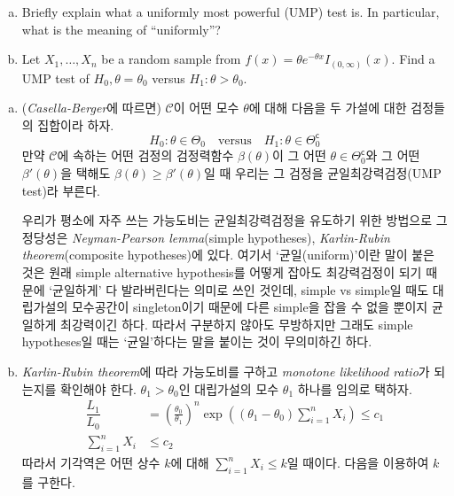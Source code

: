 \documentclass[answers]{exam}
\begin{document}
\begin{questions}
\begin{enumerate}[(a)]
      \item Briefly explain what a uniformly most powerful (UMP) test is. In particular, what is the meaning of ``uniformly''?
      \item Let $X_{1},\ldots,X_{n}$ be a random sample from $f\left(x\right)=\theta e^{-\theta x}I_{\left(0,\infty\right)}\left(x\right)$. Find a UMP test of $H_{0},\theta=\theta_{0}$ versus $H_{1}:\theta>\theta_{0}$.
    \end{enumerate}
    \begin{solution}
      \begin{enumerate}[(a)]
        \item (\emph{Casella-Berger}에 따르면) $\mathcal{C}$이 어떤 모수 $\theta$에 대해 다음을 두 가설에 대한 검정들의 집합이라 하자.
        \begin{equation}
          H_{0}:\theta\in\Theta_{0}\quad \text{versus} \quad H_{1}:\theta\in\Theta_{0}^{\mathsf{c}}
        \end{equation}
        만약 $\mathcal{C}$에 속하는 어떤 검정의 검정력함수 $\beta\left(\theta\right)$이 그 어떤 $\theta\in\Theta_{0}^{\mathsf{c}}$와 그 어떤 $\beta'\left(\theta\right)$을 택해도 $\beta\left(\theta\right)\geq \beta'\left(\theta\right)$일 때 우리는 그 검정을 균일최강력검정(UMP test)라 부른다.\par
        우리가 평소에 자주 쓰는 가능도비는 균일최강력검정을 유도하기 위한 방법으로 그 정당성은 \emph{Neyman-Pearson lemma}(simple hypotheses), \emph{Karlin-Rubin theorem}(composite hypotheses)에 있다. 여기서 `균일(uniform)'이란 말이 붙은 것은 원래 simple alternative hypothesis를 어떻게 잡아도 최강력검정이 되기 때문에 `균일하게' 다 발라버린다는 의미로 쓰인 것인데, simple vs simple일 때도 대립가설의 모수공간이 singleton이기 때문에 다른 simple을 잡을 수 없을 뿐이지 균일하게 최강력이긴 하다. 따라서 구분하지 않아도 무방하지만 그래도 simple hypotheses일 때는 `균일'하다는 말을 붙이는 것이 무의미하긴 하다.
        \item \emph{Karlin-Rubin theorem}에 따라 가능도비를 구하고 \emph{monotone likelihood ratio}가 되는지를 확인해야 한다. $\theta_{1}>\theta_{0}$인 대립가설의 모수 $\theta_{1}$ 하나를 임의로 택하자.
        \begin{align}
          \dfrac{L_{1}}{L_{0}} &= \left(\frac{\theta_{0}}{\theta_{1}}\right)^{n}\exp\left(\left(\theta_{1}-\theta_{0}\right)\sum_{i=1}^{n}X_{i}\right)\leq c_{1}\\
          \sum_{i=1}^{n}X_{i}&\leq c_{2}
        \end{align}
        따라서 기각역은 어떤 상수 $k$에 대해 $\displaystyle \sum_{i=1}^{n}X_{i}\leq k$일 때이다. 다음을 이용하여 $k$를 구한다.

\end{enumerate}
\end{solution}
\end{questions}
\end{document}
